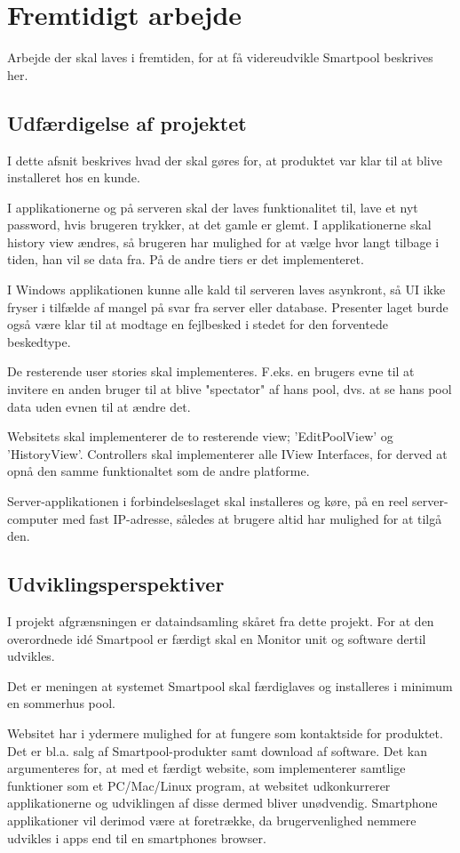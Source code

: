 \chapter{Fremtidigt arbejde}
Arbejde der skal laves i fremtiden, for at få videreudvikle Smartpool beskrives her.
\section{Udfærdigelse af projektet}
I dette afsnit beskrives hvad der skal gøres for, at produktet var klar til at blive installeret hos en kunde.

I applikationerne og på serveren skal der laves funktionalitet til, lave et nyt password, hvis brugeren trykker, at det gamle er glemt.
I applikationerne skal history view ændres, så brugeren har mulighed for at vælge hvor langt tilbage i tiden, han vil se data fra. På de andre tiers er det implementeret.

I Windows applikationen kunne alle kald til serveren laves asynkront, så UI ikke fryser i tilfælde af mangel på svar fra server eller database. Presenter laget burde også være klar til at modtage en fejlbesked i stedet for den forventede beskedtype.

De resterende user stories skal implementeres. F.eks. en brugers evne til at invitere en anden bruger til at blive "spectator" af hans pool, dvs. at se hans pool data uden evnen til at ændre det.

Websitets skal implementerer de to resterende view; 'EditPoolView' og 'HistoryView'. Controllers skal implementerer alle IView Interfaces, for derved at opnå den samme funktionaltet som de andre platforme.   

Server-applikationen i forbindelseslaget skal installeres og køre, på en reel server-computer med fast IP-adresse, således at brugere altid har mulighed for at tilgå den.


\section{Udviklingsperspektiver}
I projekt afgrænsningen er dataindsamling skåret fra dette projekt. For at den overordnede idé Smartpool er færdigt skal en Monitor unit og software dertil udvikles.

Det er meningen at systemet Smartpool skal færdiglaves og installeres i minimum en sommerhus pool.

Websitet har i ydermere mulighed for at fungere som kontaktside for produktet. Det er bl.a. salg af Smartpool-produkter samt download af software. Det kan argumenteres for, at med et færdigt website, som implementerer samtlige funktioner som et PC/Mac/Linux program, at websitet udkonkurrerer applikationerne og udviklingen af disse dermed bliver unødvendig. Smartphone applikationer vil derimod være at foretrække, da brugervenlighed nemmere udvikles i apps end til en smartphones browser.